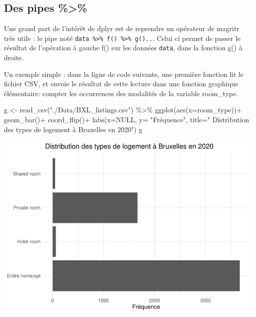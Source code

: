 \documentclass[
]{book}
\newenvironment{Shaded}{\begin{snugshade}}{\end{snugshade}}
\newcommand{\AttributeTok}[1]{\textcolor[rgb]{0.77,0.63,0.00}{#1}}
\newcommand{\ConstantTok}[1]{\textcolor[rgb]{0.00,0.00,0.00}{#1}}
\newcommand{\FunctionTok}[1]{\textcolor[rgb]{0.00,0.00,0.00}{#1}}
\newcommand{\NormalTok}[1]{#1}
\newcommand{\OtherTok}[1]{\textcolor[rgb]{0.56,0.35,0.01}{#1}}
\newcommand{\SpecialCharTok}[1]{\textcolor[rgb]{0.00,0.00,0.00}{#1}}
\newcommand{\StringTok}[1]{\textcolor[rgb]{0.31,0.60,0.02}{#1}}
\begin{document}
\hypertarget{des-pipes}{%
\subsection{Des pipes \%\textgreater\%}\label{des-pipes}}

Une grand part de l'intérêt de dplyr est de reprendre un opérateur de magritr très utile : le pipe noté \texttt{data\ \%\textgreater{}\%\ f()\ \%\textgreater{}\%\ g()..}. Celui ci permet de passer le résultat de l'opération à gauche f() sur les données \texttt{data}, dans la fonction g() à droite.

Un exemple simple : dans la ligne de code suivante, une première fonction lit le fichier CSV, et envoie le résultat de cette lecture dans une fonction graphique élémentaire: compter les occurrences des modalités de la variable room\_type.

\begin{Shaded}
\begin{Highlighting}[]
\NormalTok{g }\OtherTok{\textless{}{-}} \FunctionTok{read\_csv}\NormalTok{(}\StringTok{"./Data/BXL\_listings.csv"}\NormalTok{) }\SpecialCharTok{\%\textgreater{}\%} 
  \FunctionTok{ggplot}\NormalTok{(}\FunctionTok{aes}\NormalTok{(}\AttributeTok{x=}\NormalTok{room\_type))}\SpecialCharTok{+}
  \FunctionTok{geom\_bar}\NormalTok{()}\SpecialCharTok{+}
  \FunctionTok{coord\_flip}\NormalTok{()}\SpecialCharTok{+}
  \FunctionTok{labs}\NormalTok{(}\AttributeTok{x=}\ConstantTok{NULL}\NormalTok{, }\AttributeTok{y=} \StringTok{"Fréquence"}\NormalTok{, }\AttributeTok{title=}\StringTok{" Distribution des types de logement à Bruxelles en 2020"}\NormalTok{)}
\NormalTok{g}
\end{Highlighting}
\end{Shaded}

\includegraphics{bookdown-demo_files/figure-latex/0203-1.pdf}
\end{document}

